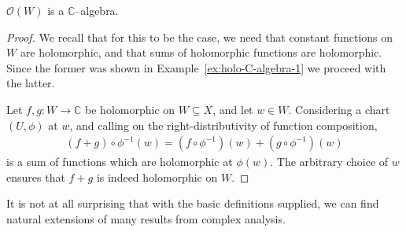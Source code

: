 \begin{proposition}
	$ \mathcal{O}(W) $ is a $ \mathbb{C} $--algebra.
	\begin{proof}
		We recall that for this to be the case, we need that constant functions on $ W $
		are holomorphic, and that sums of holomorphic functions are holomorphic. Since
		the former was shown in Example~\ref{ex:holo-C-algebra-1} we proceed with the
		latter.

		Let $ f,g:W \to \mathbb{C} $ be holomorphic on $ W \subseteq X $, and let $ w
			\in W $. Considering a chart $ (U, \phi) $ at $ w $, and calling on the
		right-distributivity of function composition,
		\begin{align*}
			(f+g)\circ \phi ^{-1}(w) = (f \circ \phi ^{-1})(w) + (g \circ \phi ^{-1})(w)
		\end{align*}
		is a sum of functions which are holomorphic at $ \phi(w) $. The arbitrary
		choice of $ w $ ensures that $ f+g $ is indeed holomorphic on $ W $.
	\end{proof}
\end{proposition}

It is not at all surprising that with the basic definitions supplied, we can
find natural extensions of many results from complex
analysis.

